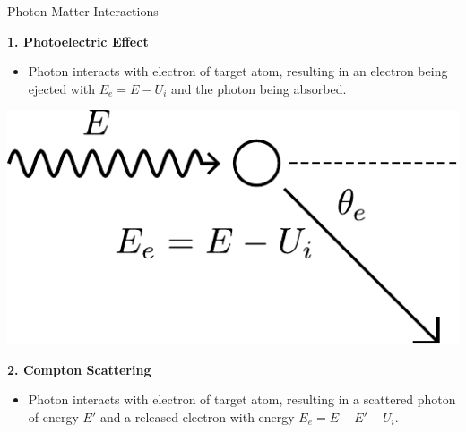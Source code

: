 \documentclass[final]{beamer}
\newlength{\colwidth}
\begin{document}
\begin{frame}[t]
\begin{columns}[t]
\begin{column}{\colwidth}
\begin{block}{Photon-Matter Interactions}
    \begin{multicols}{2}
      \begin{center}
        \textbf{1. Photoelectric Effect}
        \begin{itemize}[label=\textbullet]
          \item Photon interacts with electron of target atom, resulting in an electron being ejected with $E_e = E - U_i$ and the photon being absorbed.
        \end{itemize}
      \end{center}
      \vfill
      \begin{center}
        \includegraphics[width = 0.8\linewidth]{photoelectric_diagram.pdf}
      \end{center}
      \vspace{-0.4\baselineskip}

      \columnbreak%
      
      \begin{center}
        \textbf{2. Compton Scattering}
        \begin{itemize}[label=\textbullet]
        \item Photon interacts with electron of target atom, resulting in a scattered photon of energy $E'$ and a released electron with energy \linebreak $E_e = E - E' - U_i$.
        \end{itemize}
      \end{center}
      \vfill


\end{multicols}
\end{block}
\end{column}
\end{columns}
\end{frame}
\end{document}
